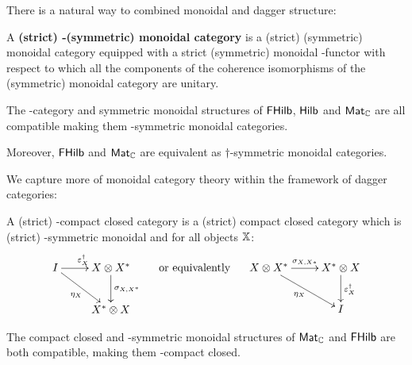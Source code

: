 There is a natural way to combined monoidal and dagger structure:
\begin{definition}
A {\bf  (strict) \dag-(symmetric) monoidal category} is a (strict) (symmetric) monoidal category equipped with a strict (symmetric) monoidal \dag-functor with respect to which all the components of the  coherence isomorphisms of the (symmetric) monoidal category are unitary.
\end{definition}
\begin{example}
The \dag-category and symmetric monoidal structures of $\mathsf{FHilb}$, $\mathsf{Hilb}$ and $\mathsf{Mat}_{\mathbb{C}}$ are all compatible making them \dag-symmetric monoidal categories.

Moreover, $\mathsf{FHilb}$ and $\mathsf{Mat}_{\mathbb{C}}$  are equivalent as $\dag$-symmetric monoidal categories.
\end{example}
We capture more of monoidal category theory within the framework of dagger categories:
\begin{definition}
A {(strict) \dag-compact closed category} is a (strict) compact closed category which is (strict) \dag-symmetric monoidal and for all objects $\mathbb{X}$:
$$
\xymatrix{
I \ar[r]^{\epsilon_X^\dag} \ar[dr]_{\eta_X}   &  X\otimes X^* \ar[d]^{\sigma_{X,X^*}}\\
 &  X^* \otimes X 
}
\hspace*{.5cm}
\text{or equivalently}
\hspace*{.5cm}
\xymatrix{
X\otimes X^* \ar[dr]_{\eta_X} \ar[r]^{\sigma_{X,X*}}
 & X^* \otimes X  \ar[d]^{\epsilon_X^\dag}\\
& I
}
$$
\end{definition}
\begin{example}
The compact closed and \dag-symmetric monoidal structures of $\mathsf{Mat}_{\mathbb{C}}$ and $\mathsf{FHilb}$ are both compatible, making them \dag-compact closed.
\end{example}
